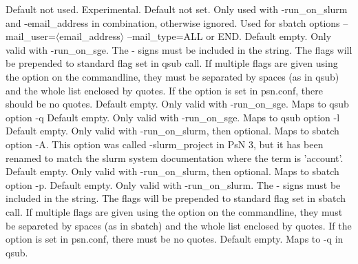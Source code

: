 \begin{optionlist}
\nextopt
{}
Default not used. Experimental.
\nextopt
{}
Default not set. Only used with -run\_on\_slurm and -email\_address in combination, otherwise ignored. Used for sbatch options --mail\_user=$\langle$email\_address$\rangle$ --mail\_type=ALL or END.  
\nextopt
{}
Default empty. Only valid with -run\_on\_sge. The - signs must be included in the string. The flags will be prepended to standard flag set in qsub call. If multiple flags are given using the option on the commandline, they must be separated by spaces (as in qsub) and the whole list enclosed by quotes. If the option is set in psn.conf, there should be no quotes. 
\nextopt
{}
Default empty. Only valid with -run\_on\_sge. Maps to qsub option -q 
\nextopt
{}
Default empty. Only valid with -run\_on\_sge. Maps to qsub option -l 
\nextopt
{}
Default empty. Only valid with -run\_on\_slurm, then optional. Maps to sbatch option -A. This option was called -slurm\_project in PsN 3, but it has been renamed to match the slurm system documentation where the term is 'account'.
\nextopt
{}
Default empty. Only valid with -run\_on\_slurm, then optional. Maps to sbatch option -p.
\nextopt
{}
Default empty. Only valid with -run\_on\_slurm. The - signs must be included in the string. The flags will be prepended to standard flag set in sbatch call. If multiple flags are given using the option on the commandline, they must be separeted by spaces (as in sbatch) and the whole list enclosed by quotes. If the option is set in psn.conf, 
there must be no quotes. 
\nextopt
{}
Default empty. Maps to -q in qsub. 
\nextopt
\end{optionlist}
